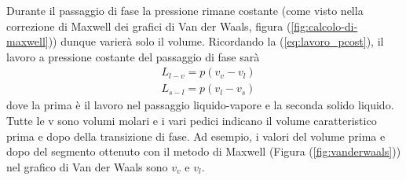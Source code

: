 \documentclass[10pt,a4paper]{article}
\begin{document}
Durante il passaggio di fase la pressione rimane costante (come visto nella correzione di Maxwell dei grafici di Van der Waals, figura (\ref{fig:calcolo-di-maxwell})) dunque varierà solo il volume. Ricordando la (\ref{eq:lavoro_pcost}), il lavoro a pressione costante del passaggio di fase sarà
\begin{align*} 
	&L_{l-v} = p(v_v-v_l)\\
	&L_{s-l} = p(v_l-v_s)
\end{align*} 
dove la prima è il lavoro nel passaggio liquido-vapore e la seconda solido liquido. Tutte le v sono volumi molari e i vari pedici indicano il volume caratteristico prima e dopo della transizione di fase. Ad esempio, i valori del volume prima e dopo del segmento ottenuto con il metodo di Maxwell (Figura (\ref{fig:vanderwaals})) nel grafico di Van der Waals sono $v_v$ e $v_l$.
\end{document}
